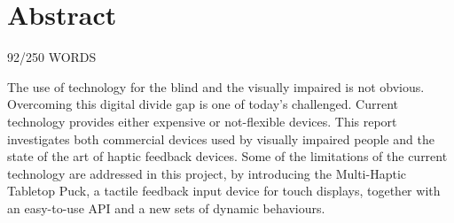 \section{Abstract}
92/250 WORDS

The use of technology for the blind and the visually impaired is not obvious. Overcoming this digital divide gap is one of today's challenged. Current technology provides either expensive or not-flexible devices. 
This report investigates both commercial devices used by visually impaired people and the state of the art of haptic feedback devices. 
Some of the limitations of the current technology are addressed in this project, by introducing the Multi-Haptic Tabletop Puck, a tactile feedback input device for touch displays, together with an easy-to-use API and a new sets of dynamic behaviours.